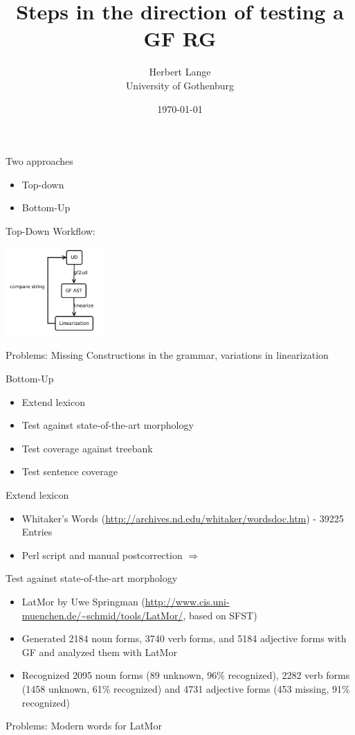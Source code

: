 \documentclass{beamer}
\title[The Latin Language Ressource Grammar]{Steps in the direction of testing a GF RG}
\author{Herbert Lange\\University of Gothenburg}
\date{\today}
\begin{document}
\frame{\titlepage}

\begin{frame}
  Two approaches
  \begin{itemize}
    \item Top-down
    \item  Bottom-Up
  \end{itemize}
\end{frame}
\begin{frame}{Top-Down}
  Workflow:
  
  \includegraphics[width=10em]{ud.pdf}

  Problems: Missing Constructions in the grammar, variations in linearization
\end{frame}
\begin{frame}{Bottom-Up}
  \begin{itemize}
  \item Extend lexicon
  \item Test against state-of-the-art morphology
  \item Test coverage against treebank
  \item Test sentence coverage
  \end{itemize}
\end{frame}
\begin{frame}{Extend lexicon}
    \begin{itemize}
    \item Whitaker's Words (\url{http://archives.nd.edu/whitaker/wordsdoc.htm}) - 39225 Entries
    \item Perl script and manual postcorrection $\Rightarrow$ 
    \end{itemize}
\end{frame}
\begin{frame}{Test against state-of-the-art morphology}
    \begin{itemize}
    \item LatMor by Uwe Springman (\url{http://www.cis.uni-muenchen.de/~schmid/tools/LatMor/}, based on SFST)
    \item Generated 2184 noun forms, 3740 verb forms, and 5184 adjective forms with GF and analyzed them with LatMor
    \item Recognized 2095 noun forms (89 unknown, 96\% recognized), 2282 verb forms (1458 unknown, 61\% recognized) and 4731 adjective forms (453 missing, 91\% recognized)
    \end{itemize}
    Problems: Modern words for LatMor
\end{frame}
\end{document}
